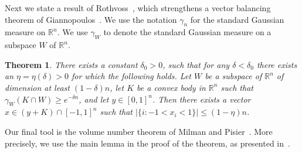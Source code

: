 \documentclass{article}
\newtheorem{theorem}{Theorem}
\newcommand{\cut}[1]{}
\newcommand{\R}{{\mathbb{R}}}
\newcommand{\eqdef}{\triangleq}
\DeclareMathOperator{\vol}{vol}
\DeclareMathOperator{\cov}{cov}
\begin{document}
\cut{
\begin{proof}
  Let $M \eqdef \cov(K)$, and denote the eigenvalues of $M$ by
  $\lambda_1 \ge \ldots \ge \lambda_n$. Observe that $\cov(Q(K)) =
  QMQ$. It's a classical fact in linear algebra that, for any
  orthogonal projection $Q$ of rank $k$, $\det(QMQ) \le \lambda_1
  \ldots \lambda_k$. This, and the fact that $L_{K'} \ge L_{B_2^n} =
  c_0$ for any convex body $K'$, and a universal constant $c_0$
  independent of the dimension, show that
  \begin{equation}\label{eq:cov-estimate}
    \sup \vol_{k}(Q(B_Y^\circ))
    = \sup \frac{\det(QMQ)}{L^k_{Q(K)}}
    \le C_0^k\lambda_1\ldots \lambda_k,
  \end{equation}
  where $C_0 = \frac{1}{c_0}$, and the supremum is over rank $k$
  orthogonal projections $Q$, as in the statement of the lemma. 
  
  Let now $S \subseteq [n]$ be the set of size $k$ guaranteed by
  Lemma~\ref{lm:rip-det}. Because $M_{S,S} = Q_S M Q_S$ is the
  covariance of $Q_S(K)$, we have:
  \begin{equation}\label{eq:rip-estimate}
  \lambda_1\ldots \lambda_k
  \le
  {n\choose k}\det(M_{S,S})
  =
  {n\choose  k} L^k_{Q_S(K)}\vol_k(Q_S(K)).
  \end{equation}
  Combining \eqref{eq:cov-estimate} and \eqref{eq:rip-estimate} proves
  the lemma. 
\end{proof}
Lemma~\ref{lm:coordproj} is the only place where estimates on
isotropic constants come in.}

Next we state a result of Rothvoss~\cite{rothvoss-giann}, which
strengthens a vector balancing theorem of
Giannopoulos~\cite{giannop}. We use the notation $\gamma_n$ for the
standard Gaussian measure on $\R^n$. We use $\gamma_W$ to denote the
standard Gaussian measure on a subspace $W$ of $\R^n$.
\begin{theorem}\label{thm:giann}
  There exists a constant $\delta_0 > 0$, such that for any $\delta <
  \delta_0$ there exists an $\eta = \eta(\delta) > 0$ for which the
  following holds. Let $W$ be a subspace of $\R^n$ of dimension at
  least $(1 - \delta)n$, let $K$ be a convex body in $\R^n$ such that
  $\gamma_W(K\cap W) \ge e^{-\delta n}$, and let $y \in [0,1]^n$. Then there
  exists a vector $x \in (y + K) \cap [-1, 1]^n$ such that $|\{i: -1 <
  x_i < 1\}| \le (1-\eta)n$.
\end{theorem}

Our final tool is the volume number theorem of Milman and
Pisier~\cite{MP-volnum}. More precisely,
we use the main lemma in the proof of the theorem, as presented
in~\cite{Pisier-book}. 
\end{document}
